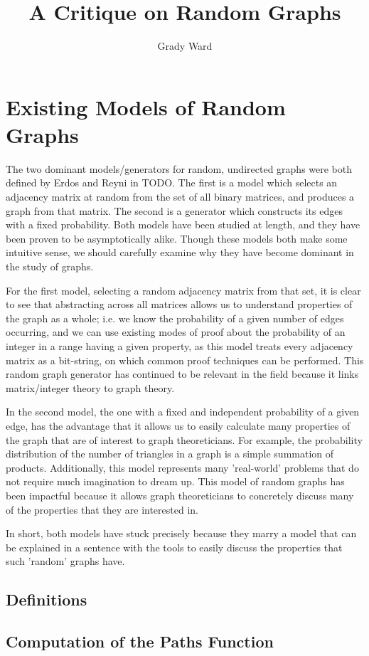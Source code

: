 \documentclass[a4paper,12pt]{article}
\begin{document}
\lstset{language=Python}

\title{A Critique on Random Graphs}

\author{Grady Ward}

\maketitle

\section*{Existing Models of Random Graphs}

The two dominant models/generators for random, undirected graphs were both defined by Erdos and Reyni in TODO.
The first is a model which selects an adjacency matrix at random from the set of all binary matrices, and produces a
graph from that matrix. The second is a generator which constructs its edges with a fixed probability. Both models 
have been studied at length, and they have been proven to be asymptotically alike. Though these models both make
some intuitive sense, we should carefully examine why they have become dominant in the study of graphs.

For the first model, selecting a random adjacency matrix from that set, it is clear to see that abstracting across
all matrices allows us to understand properties of the graph as a whole; i.e. we know the probability of a given number of
edges occurring, and we can use existing modes of proof about the probability of an integer in a range having a given
property, as this model treats every adjacency matrix as a bit-string, on which common proof techniques can be performed.
This random graph generator has continued to be relevant in the field because it links matrix/integer theory to graph theory.

In the second model, the one with a fixed and independent probability of a given edge, has the advantage that it allows
us to easily calculate many properties of the graph that are of interest to graph theoreticians.
For example, the probability distribution of the number of triangles in a graph is a simple summation of products.
Additionally, this model represents many 'real-world' problems that do not require much imagination to dream up.
This model of random graphs has been impactful because it allows graph theoreticians to concretely discuss many of the 
properties that they are interested in.

In short, both models have stuck precisely because they marry a model that can be explained in a sentence 
with the tools to easily discuss the properties that such 'random' graphs have.

\subsection{Definitions}

\subsection{Computation of the Paths Function}
\end{document}
